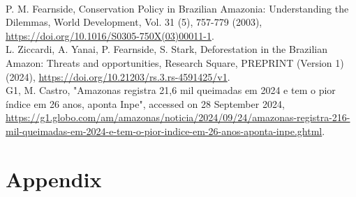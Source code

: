 \documentclass[a4paper,fleqn]{cas-dc}
\begin{document}
\begin{thebibliography}{00}
\\
 P. M. Fearnside, Conservation Policy in Brazilian Amazonia: Understanding the Dilemmas, World Development, Vol. 31 (5), 757-779 (2003), \href{https://doi.org/10.1016/S0305-750X(03)00011-1}{https://doi.org/10.1016/S0305-750X(03)00011-1}.
\\
 L. Ziccardi, A. Yanai, P. Fearnside, S. Stark, Deforestation in the Brazilian Amazon: Threats and opportunities, Research Square, PREPRINT (Version 1) (2024), \href{https://doi.org/10.21203/rs.3.rs-4591425/v1}{https://doi.org/10.21203/rs.3.rs-4591425/v1}.
\\
 G1, M. Castro, "Amazonas registra 21,6 mil queimadas em 2024 e tem o pior índice em 26 anos, aponta Inpe", accessed on 28 September 2024, \href{https://g1.globo.com/am/amazonas/noticia/2024/09/24/amazonas-registra-216-mil-queimadas-em-2024-e-tem-o-pior-indice-em-26-anos-aponta-inpe.ghtml}{https://g1.globo.com/am/amazonas/noticia/2024/09/24/amazonas-registra-216-mil-queimadas-em-2024-e-tem-o-pior-indice-em-26-anos-aponta-inpe.ghtml}.
\\

\end{thebibliography}

\clearpage

\appendix
\renewcommand{\thetable}{A.\arabic{table}}
\setcounter{table}{0}  %

\section{Appendix}
\end{document}
